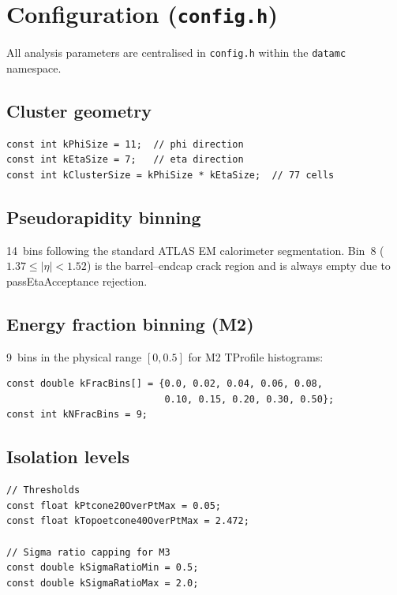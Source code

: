 \documentclass[12pt,a4paper]{article}
\begin{document}
\section{Configuration (\texttt{config.h})}
\label{sec:config}

All analysis parameters are centralised in \texttt{config.h} within the
\texttt{datamc} namespace.

\subsection{Cluster geometry}

\begin{lstlisting}[style=cppstyle]
const int kPhiSize = 11;  // phi direction
const int kEtaSize = 7;   // eta direction
const int kClusterSize = kPhiSize * kEtaSize;  // 77 cells
\end{lstlisting}

\subsection{Pseudorapidity binning}

14~bins following the standard ATLAS EM calorimeter segmentation.
Bin~8 ($1.37 \leq |\eta| < 1.52$) is the barrel--endcap crack region
and is always empty due to passEtaAcceptance rejection.

\subsection{Energy fraction binning (M2)}

9~bins in the physical range $[0, 0.5]$ for M2 TProfile histograms:
\begin{lstlisting}[style=cppstyle]
const double kFracBins[] = {0.0, 0.02, 0.04, 0.06, 0.08,
                            0.10, 0.15, 0.20, 0.30, 0.50};
const int kNFracBins = 9;
\end{lstlisting}

\subsection{Isolation levels}

\begin{lstlisting}[style=cppstyle]
// Thresholds
const float kPtcone20OverPtMax = 0.05;
const float kTopoetcone40OverPtMax = 2.472;

// Sigma ratio capping for M3
const double kSigmaRatioMin = 0.5;
const double kSigmaRatioMax = 2.0;
\end{lstlisting}
\end{document}
